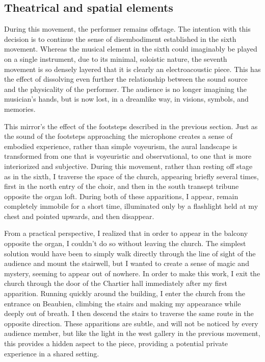\documentclass[12pt,twoside,maitrise]{dms_ks}
\theoremstyle{definition}
\begin{document}
{\subsection{Theatrical and spatial elements}

During this movement, the performer remains offstage. 
The intention with this decision is to continue the sense of disembodiment established in the sixth movement. 
Whereas the musical element in the sixth could imaginably be played on a single instrument, due to its minimal, soloistic nature, the seventh movement is so densely layered that it is clearly an electroacoustic piece. 
This has the effect of dissolving even further the relationship between the sound source and the physicality of the performer. 
The audience is no longer imagining the musician’s hands, but is now lost, in a dreamlike way, in visions, symbols, and memories. 

This mirror’s the effect of the footsteps described in the previous section. 
Just as the sound of the footsteps approaching the microphone creates a sense of embodied experience, rather than simple voyeurism, the aural landscape is transformed from one that is voyeuristic and observational, to one that is more interiorized and subjective. 
During this movement, rather than resting off stage as in the sixth, I traverse the space of the church, appearing briefly several times, first in the north entry of the choir, and then in the south transept tribune opposite the organ loft. 
During both of these apparitions, I appear, remain completely immobile for a short time, illuminated only by a flashlight held at my chest and pointed upwards, and then disappear.

From a practical perspective, I realized that in order to appear in the balcony opposite the organ, I couldn't do so without leaving the church. 
The simplest solution would have been to simply walk directly through the line of sight of the audience and mount the stairwell, but I wanted to create a sense of magic and mystery, seeming to appear out of nowhere. 
In order to make this work, I exit the church through the door of the Chartier hall immediately after my first apparition. 
Running quickly around the building, I enter the church from the entrance on Beaubien, climbing the stairs and making my appearance while deeply out of breath. 
I then descend the stairs to traverse the same route in the opposite direction.
These apparitions are subtle, and will not be noticed by every audience member, but like the light in the west gallery in the previous movement, this provides a hidden aspect to the piece, providing a potential private experience in a shared setting. 

}
\end{document}
